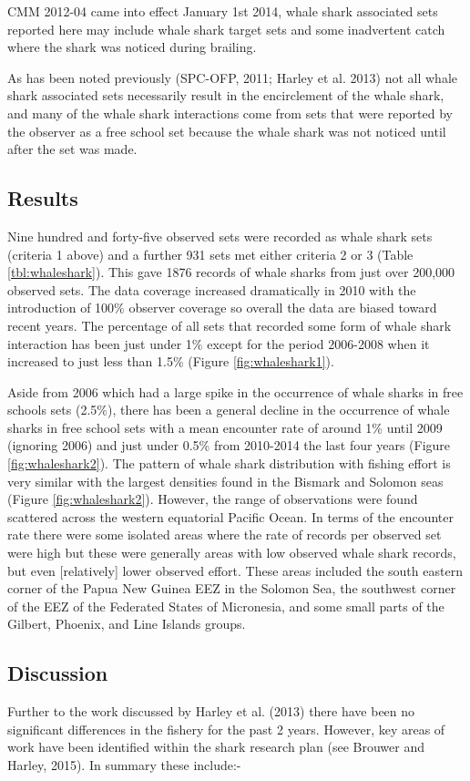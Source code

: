 \documentclass[12pt]{SCreport}
\begin{document}
CMM 2012-04 came into effect January 1st 2014, whale shark associated sets reported here may include whale shark target sets and some inadvertent catch where the shark was noticed during brailing.

As has been noted previously (SPC-OFP, 2011; Harley et al. 2013) not all whale shark associated sets necessarily result in the encirclement of the whale shark, and many of the whale shark interactions come from sets that were reported by the observer as a free school set because the whale shark was not noticed until after the set was made. 

\subsection{Results}
Nine hundred and forty-five observed sets were recorded as whale shark sets (criteria 1 above) and a further 931 sets met either criteria 2 or 3 (Table  \ref{tbl:whaleshark}). This gave 1876 records of whale sharks from just over 200,000 observed sets. The data coverage increased dramatically in 2010 with the introduction of 100\% observer coverage so overall the data are biased toward recent years. The percentage of all sets that recorded some form of whale shark interaction has been just under 1\% except for the period 2006-2008 when it increased to just less than 1.5\% (Figure \ref{fig:whaleshark1}).

Aside from 2006 which had a large spike in the occurrence of whale sharks in free schools sets (2.5\%), there has been a general decline in the occurrence of whale sharks in free school sets with a mean encounter rate of around 1\%  until 2009 (ignoring 2006) and just under 0.5\% from 2010-2014 the last four years (Figure \ref{fig:whaleshark2}).  The pattern of whale shark distribution with fishing effort is very similar with the largest densities found in the Bismark and Solomon seas (Figure \ref{fig:whaleshark2}). However, the range of observations were found scattered across the western equatorial Pacific Ocean. In terms of the encounter rate there were some isolated areas where the rate of records per observed set were high but these were generally areas with low observed whale shark records, but even [relatively] lower observed effort. These areas included the south eastern corner of the Papua New Guinea EEZ in the Solomon Sea, the southwest corner of the EEZ of the Federated States of Micronesia, and some small parts of the Gilbert, Phoenix, and Line Islands groups.
  
\subsection{Discussion}  
Further to the work discussed by Harley et al. (2013) there have been no significant differences in the fishery for the past 2 years.  However, key areas of work have been identified within the shark research plan (see Brouwer and Harley, 2015).  In summary these include:-
\end{document}
